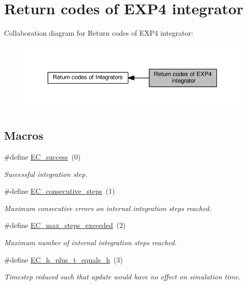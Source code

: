 \hypertarget{group__exp4__ErrCodes}{}\section{Return codes of E\+X\+P4 integrator}
\label{group__exp4__ErrCodes}
Collaboration diagram for Return codes of E\+X\+P4 integrator\+:\nopagebreak
\begin{figure}[H]
\begin{center}
\leavevmode
\includegraphics[width=350pt]{group__exp4__ErrCodes}
\end{center}
\end{figure}
\subsection*{Macros}
\begin{DoxyCompactItemize}
\item 
\#define \hyperlink{group__exp4__ErrCodes_gabd83bc0f9f475a2189a4db4a08b790ca}{E\+C\+\_\+success}~(0)
\begin{DoxyCompactList}\small\item\em Successful integration step. \end{DoxyCompactList}\item 
\#define \hyperlink{group__exp4__ErrCodes_gae0287841c08f86f5709660fd731615ad}{E\+C\+\_\+consecutive\+\_\+steps}~(1)
\begin{DoxyCompactList}\small\item\em Maximum consecutive errors on internal integration steps reached. \end{DoxyCompactList}\item 
\#define \hyperlink{group__exp4__ErrCodes_ga0f0275d9851ab5c19b79a963d5084df3}{E\+C\+\_\+max\+\_\+steps\+\_\+exceeded}~(2)
\begin{DoxyCompactList}\small\item\em Maximum number of internal integration steps reached. \end{DoxyCompactList}\item 
\#define \hyperlink{group__exp4__ErrCodes_ga9326efd544880e2683c4453365ca2704}{E\+C\+\_\+h\+\_\+plus\+\_\+t\+\_\+equals\+\_\+h}~(3)
\begin{DoxyCompactList}\small\item\em Timestep reduced such that update would have no effect on simulation time. \end{DoxyCompactList}\end{DoxyCompactItemize}


